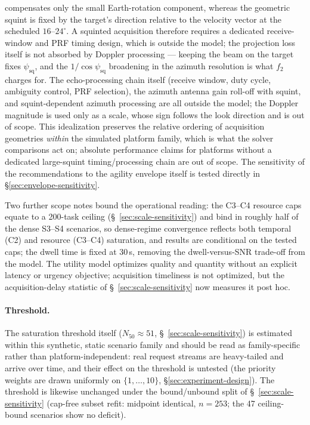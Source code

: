 \documentclass[preprint,12pt,authoryear]{elsarticle}
\begin{document}
compensates only the small Earth-rotation component, whereas the geometric
squint is fixed by the target's direction relative to the velocity vector at
the scheduled $16$--$24^\circ$. A squinted acquisition therefore requires a
dedicated receive-window and PRF timing design, which is outside the model;
the projection loss itself is not absorbed by Doppler processing --- keeping
the beam on the target fixes $\psi_{\text{sq}}$, and the
$1/\cos\psi_{\text{sq}}$ broadening in the azimuth resolution is what $f_2$
charges for. The echo-processing chain itself (receive window, duty
cycle, ambiguity control, PRF selection), the azimuth antenna gain roll-off
with squint, and squint-dependent azimuth processing are all outside the
model; the Doppler magnitude is used only as a scale, whose sign follows the
look direction and is out of scope. This idealization preserves the
relative ordering of acquisition geometries \emph{within} the simulated
platform family, which is what the solver comparisons act on; absolute
performance claims for platforms without a dedicated large-squint
timing/processing chain are out of scope. The sensitivity of the recommendations to the
agility envelope itself is tested directly in \S\ref{sec:envelope-sensitivity}.

Two further scope notes bound the operational reading: the C3--C4 resource
caps equate to a 200-task ceiling (\S~\ref{sec:scale-sensitivity}) and bind in
roughly half of the dense S3--S4 scenarios, so dense-regime convergence
reflects both temporal (C2) and resource (C3--C4) saturation, and results
are conditional on the tested caps; the
dwell time is fixed at 30\,s, removing the dwell-versus-SNR trade-off from
the model. The utility model optimizes quality and quantity without an explicit
latency or urgency objective; acquisition timeliness is not optimized, but
the acquisition-delay statistic of \S~\ref{sec:scale-sensitivity}
now measures it post hoc.

\paragraph{Threshold.}
The saturation threshold itself ($N_{50} \approx 51$,
\S~\ref{sec:scale-sensitivity}) is estimated within this synthetic, static
scenario family and should be read as family-specific rather than
platform-independent: real request streams are heavy-tailed and arrive
over time, and their effect on the threshold is untested (the priority
weights are drawn uniformly on $\{1,\dots,10\}$,
\S\ref{sec:experiment-design}). The threshold is likewise unchanged under the
bound/unbound split of \S~\ref{sec:scale-sensitivity} (cap-free subset refit:
midpoint identical, $n=253$; the 47 ceiling-bound scenarios show no
deficit).
\end{document}
